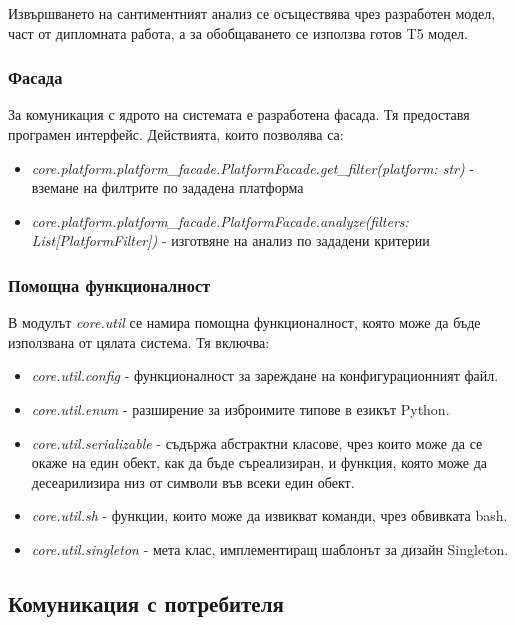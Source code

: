 \documentclass{article}
\begin{document}
Извършването на сантиментният анализ се осъществява чрез разработен модел, част от дипломната работа, а за обобщаването
се използва готов T5 модел.

\subsubsection{Фасада}

За комуникация с ядрото на системата е разработена фасада. Тя предоставя програмен интерфейс. Действията, които
позволява са:

\begin{itemize}
  \item \textit{core.platform.platform\_facade.PlatformFacade.get\_filter(platform: str)} - вземане на филтрите по
  зададена платформа
  \item \textit{core.platform.platform\_facade.PlatformFacade.analyze(filters: List[PlatformFilter])} - изготвяне на
  анализ по зададени критерии
\end{itemize}

\subsubsection{Помощна функционалност}

В модулът \textit{core.util} се намира помощна функционалност, която може да бъде използвана от цялата система. Тя
включва:

\begin{itemize}
  \item \textit{core.util.config} - функционалност за зареждане на конфигурационният файл.
  \item \textit{core.util.enum} - разширение за изброимите типове в езикът Python.
  \item \textit{core.util.serializable} - съдържа абстрактни класове, чрез които може да се окаже на един обект, как
  да бъде съреализиран, и функция, която може да десеарилизира низ от символи във всеки един обект.
  \item \textit{core.util.sh} - функции, които може да извикват команди, чрез обвивката bash.
  \item \textit{core.util.singleton} - мета клас, имплементиращ шаблонът за дизайн Singleton.
\end{itemize}

\subsection{Комуникация с потребителя}
\end{document}
